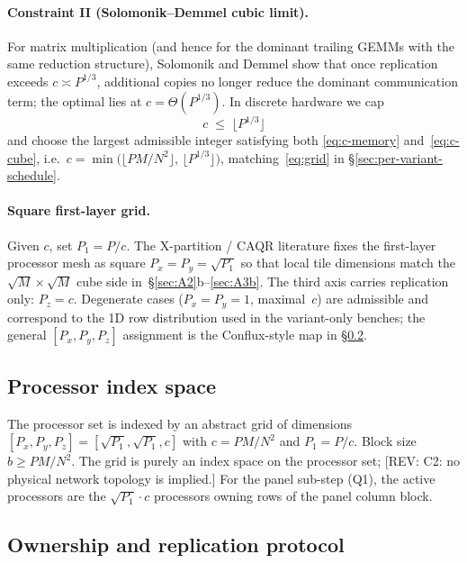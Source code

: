 \documentclass[11pt]{article}
\newcommand{\REV}[1]{\textcolor{blue!60!black}{\small\textsf{[REV: #1]}}}
\begin{document}
\paragraph{Constraint II (Solomonik--Demmel cubic limit).}
For matrix multiplication (and hence for the dominant trailing GEMMs
with the same reduction structure), Solomonik and Demmel show that
once replication exceeds $c \asymp P^{1/3}$, additional copies no
longer reduce the dominant communication term; the optimal lies at
$c = \Theta(P^{1/3})$.  In discrete hardware we cap
\begin{equation}
  c \;\le\; \bigl\lfloor P^{1/3} \bigr\rfloor
  \label{eq:c-cube}
\end{equation}
and choose the largest admissible integer satisfying both
\eqref{eq:c-memory} and~\eqref{eq:c-cube}, i.e.\
$c = \min\bigl(\lfloor PM/N^2 \rfloor,\, \lfloor P^{1/3} \rfloor\bigr)$,
matching~\eqref{eq:grid} in \S\ref{sec:per-variant-schedule}.

\paragraph{Square first-layer grid.}
Given $c$, set $P_1 = P/c$.  The X-partition / CAQR literature fixes the
first-layer processor mesh as square $P_x = P_y = \sqrt{P_1}$ so that
local tile dimensions match the $\sqrt{M} \times \sqrt{M}$ cube side
in~\S\ref{sec:A2}b--\ref{sec:A3b}.  The third axis carries replication
only: $P_z = c$.  Degenerate cases ($P_x = P_y = 1$, maximal~$c$) are
admissible and correspond to the 1D row distribution used in the
variant-only benches; the general $[P_x,P_y,P_z]$ assignment is the
Conflux-style map in \S\ref{sec:A3aprime}.

\subsection{Processor index space}
\label{sec:A3a}
The processor set is indexed by an abstract grid of dimensions
$[P_x, P_y, P_z] = [\sqrt{P_1}, \sqrt{P_1}, c]$ with $c = PM/N^2$ and
$P_1 = P/c$. Block size $b \ge PM/N^2$. The grid is purely an index
space on the processor set; \REV{C2: no physical network topology is
implied.} For the panel sub-step (Q1), the active processors are the
$\sqrt{P_1} \cdot c$ processors owning rows of the panel column block.

\subsection{Ownership and replication protocol}
\label{sec:A3aprime}
\end{document}
